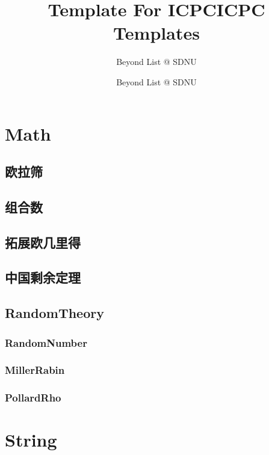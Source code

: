 \documentclass[10pt,a4paper]{article}
\title{Template For ICPC}
\author{Beyond List @ SDNU}
\begin{document}
\title{ICPC Templates}
\author {Beyond List @ SDNU}
\maketitle
\tableofcontents
\newpage
\section{Math}
\subsection{欧拉筛}

\subsection{组合数}

\subsection{拓展欧几里得}
\begin{spacing}{1.5}

\end{spacing}

\subsection{中国剩余定理}

\subsection{RandomTheory}
\subsubsection{RandomNumber}

\subsubsection{MillerRabin}

\subsubsection{PollardRho}
\begin{spacing}{1.5}

\end{spacing}

\section{String}
\end{document}
